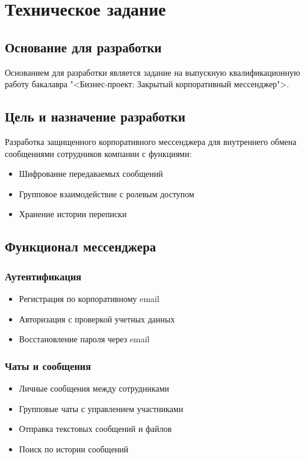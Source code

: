 \section{Техническое задание}
\subsection{Основание для разработки}

Основанием для разработки является задание на выпускную квалификационную работу бакалавра "<Бизнес-проект: Закрытый корпоративный мессенджер">.

\subsection{Цель и назначение разработки}

Разработка защищенного корпоративного мессенджера для внутреннего обмена сообщениями сотрудников компании с функциями:
\begin{itemize}
	\item Шифрование передаваемых сообщений
	\item Групповое взаимодействие с ролевым доступом
	\item Хранение истории переписки
\end{itemize}

	
\subsection{Функционал мессенджера}

\subsubsection{Аутентификация}
\begin{itemize}
	\item Регистрация по корпоративному email
	\item Авторизация с проверкой учетных данных
	\item Восстановление пароля через email
\end{itemize}

\subsubsection{Чаты и сообщения}
\begin{itemize}
	\item Личные сообщения между сотрудниками
	\item Групповые чаты с управлением участниками
	\item Отправка текстовых сообщений и файлов
	\item Поиск по истории сообщений
\end{itemize}

